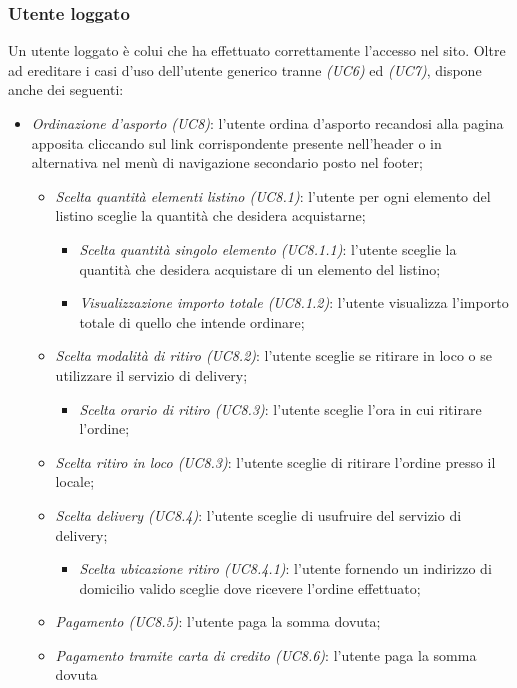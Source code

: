 \subsubsection{Utente loggato}
Un utente loggato è colui che ha effettuato correttamente l'accesso nel sito. Oltre ad ereditare i casi
d'uso dell'utente generico tranne \textit{(UC6)} ed \textit{(UC7)}, dispone anche dei seguenti:
\begin{itemize}
	\item \textit{Ordinazione d'asporto (UC8)}: l'utente ordina d'asporto recandosi alla pagina apposita
	cliccando sul link corrispondente presente nell'header o in alternativa nel menù di navigazione
	secondario posto nel footer;
	\begin{itemize}
		\item \textit{Scelta quantità elementi listino (UC8.1)}: l'utente per ogni
		elemento del listino sceglie la quantità che desidera acquistarne;
		\begin{itemize}
			\item \textit{Scelta quantità singolo elemento (UC8.1.1)}: l'utente sceglie la quantità che
			desidera acquistare di un elemento del listino;
			\item \textit{Visualizzazione importo totale (UC8.1.2)}: l'utente visualizza l'importo totale
			di quello che intende ordinare;
		\end{itemize}
		\item \textit{Scelta modalità di ritiro (UC8.2)}: l'utente sceglie se ritirare in loco o se
		utilizzare il servizio di delivery;
		\begin{itemize}
			\item \textit{Scelta orario di ritiro (UC8.3)}: l'utente sceglie l'ora in cui ritirare
			l'ordine;
		\end{itemize}
		\item \textit{Scelta ritiro in loco (UC8.3)}: l'utente sceglie di ritirare l'ordine presso il
		locale;
		\item \textit{Scelta delivery (UC8.4)}: l'utente sceglie di usufruire del servizio di delivery;
		\begin{itemize}
			\item \textit{Scelta ubicazione ritiro (UC8.4.1)}: l'utente fornendo un indirizzo di
			domicilio valido sceglie dove ricevere l'ordine effettuato;
		\end{itemize}
		\item \textit{Pagamento (UC8.5)}: l'utente paga la somma dovuta;
		\item \textit{Pagamento tramite carta di credito (UC8.6)}: l'utente paga la somma dovuta

\end{itemize}
\end{itemize}
